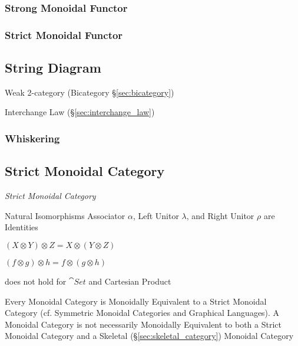 \subsubsection{Strong Monoidal Functor}\label{sec:strong_monoidal_functor}

\subsubsection{Strict Monoidal Functor}\label{sec:strict_monoidal_functor}



\subsection{String Diagram}\label{sec:string_diagram}

Weak 2-category (Bicategory \S\ref{sec:bicategory})

Interchange Law (\S\ref{sec:interchange_law})



\subsubsection{Whiskering}\label{sec:whiskering}



\subsection{Strict Monoidal Category}\label{sec:strict_monoidal}

\emph{Strict Monoidal Category}

Natural Isomorphisms Associator $\alpha$, Left Unitor $\lambda$, and
Right Unitor $\rho$ are Identities

$(X \otimes Y) \otimes Z = X \otimes (Y \otimes Z)$

$(f \otimes g) \otimes h = f \otimes (g \otimes h)$

does not hold for $\cat{Set}$ and Cartesian Product

Every Monoidal Category is Monoidally Equivalent to a Strict Monoidal
Category (cf. Symmetric Monoidal Categories and Graphical Languages).
A Monoidal Category is not necessarily Monoidally Equivalent to both a
Strict Monoidal Category and a Skeletal
(\S\ref{sec:skeletal_category}) Monoidal Category



